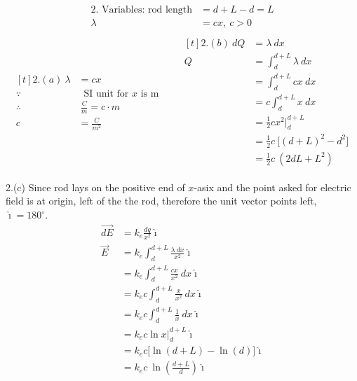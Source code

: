 \documentclass[11pt]{article}
\begin{document}
\newpage
\begin{align*}
\text{2. Variables: }
\text{rod length} &= d + L - d = L \\
          \lambda &= cx,\ c > 0 \\
\end{align*}
\begin{align*}
\begin{aligned}[t]
2.(a)\ \lambda &= cx \\
       \because &\ \text{ SI unit for } x \text{ is m} \\
       \therefore &\ \frac{C}{m} = c \cdot m \\
       c &= \frac{C}{m^{2}}
\end{aligned}
&\quad
\begin{aligned}[t]
2.(b)\ dQ &= \lambda \ dx \\
        Q &= \int_{d}^{d+L} \lambda \ dx \\
          &= \int_{d}^{d+L} cx \ dx \\
          &= c \int_{d}^{d+L} x \ dx \\
          &= \tfrac{1}{2} c x^{2} \bigg |_{d}^{d+L} \\
          &= \tfrac{1}{2} c \ \big [ (d+L)^{2} - d^{2} \big ] \\
          &= \tfrac{1}{2} c \ ( 2dL + L^{2} )
\end{aligned}
\end{align*}

2.(c) Since rod lays on the positive end of \(x\)-asix and the point asked for electric field is at origin, left of the the rod, therefore the unit vector points left, \(\hat{\imath} = 180^{\circ}\).
\begin{align*}
\overrightarrow{dE} &= k_{e} \frac{dq}{x^{2}} \hat{\imath} \\
\overrightarrow{E} &= k_{e} \int_{d}^{d+L} \frac{\lambda \ dx}{x^{2}} \hat{\imath} \\
                   &= k_{e} \int_{d}^{d+L} \frac{cx}{x^{2}} \ dx \hat{\imath} \\
                   &= k_{e}c \int_{d}^{d+L} \frac{x}{x^{2}} \ dx \hat{\imath} \\
                   &= k_{e}c \int_{d}^{d+L} \frac{1}{x} \ dx \hat{\imath} \\
                   &= k_{e}c \ln{x} \big |_{d}^{d+L} \hat{\imath} \\
                   &= k_{e}c \big [ \ln(d+L) - \ln(d) \big ] \hat{\imath} \\
                   &= k_{e}c \ \ln( \frac{d+L}{d}) \hat{\imath}
\end{align*}
\end{document}
